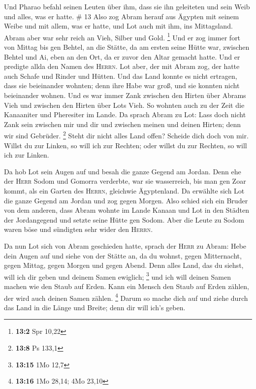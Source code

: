  Und Pharao befahl seinen Leuten über ihm, dass sie ihn
geleiteten und sein Weib und alles, was er hatte. \# 13 
Also zog Abram herauf aus Ägypten mit seinem Weibe und mit allem, was er
hatte, und Lot auch mit ihm, ins Mittagsland.  Abram aber
war sehr reich an Vieh, Silber und Gold. \footnote{\textbf{13:2} Spr
  10,22}  Und er zog immer fort von Mittag bis gen Behtel,
an die Stätte, da am ersten seine Hütte war, zwischen Behtel und Ai,
 eben an den Ort, da er zuvor den Altar gemacht hatte. Und
er predigte allda den Namen des \textsc{Herrn}.  Lot aber,
der mit Abram zog, der hatte auch Schafe und Rinder und Hütten.
 Und das Land konnte es nicht ertragen, dass sie
beieinander wohnten; denn ihre Habe war groß, und sie konnten nicht
beieinander wohnen.  Und es war immer Zank zwischen den
Hirten über Abrams Vieh und zwischen den Hirten über Lots Vieh. So
wohnten auch zu der Zeit die Kanaaniter und Pheresiter im Lande.
 Da sprach Abram zu Lot: Lass doch nicht Zank sein
zwischen mir und dir und zwischen meinen und deinen Hirten; denn wir
sind Gebrüder. \footnote{\textbf{13:8} Ps 133,1}  Steht
dir nicht alles Land offen? Scheide dich doch von mir. Willst du zur
Linken, so will ich zur Rechten; oder willst du zur Rechten, so will ich
zur Linken.

 Da hob Lot sein Augen auf und besah die ganze Gegend am
Jordan. Denn ehe der \textsc{Herr} Sodom und Gomorra verderbte, war sie
wasserreich, bis man gen Zoar kommt, als ein Garten des \textsc{Herrn},
gleichwie Ägyptenland.  Da erwählte sich Lot die ganze
Gegend am Jordan und zog gegen Morgen. Also schied sich ein Bruder von
dem anderen,  dass Abram wohnte im Lande Kanaan und Lot
in den Städten der Jordangegend und setzte seine Hütte gen Sodom.
 Aber die Leute zu Sodom waren böse und sündigten sehr
wider den \textsc{Herrn}.

 Da nun Lot sich von Abram geschieden hatte, sprach der
\textsc{Herr} zu Abram: Hebe dein Augen auf und siehe von der Stätte an,
da du wohnst, gegen Mitternacht, gegen Mittag, gegen Morgen und gegen
Abend.  Denn alles Land, das du siehst, will ich dir
geben und deinem Samen ewiglich; \footnote{\textbf{13:15} 1Mo 12,7}
 und ich will deinen Samen machen wie den Staub auf
Erden. Kann ein Mensch den Staub auf Erden zählen, der wird auch deinen
Samen zählen. \footnote{\textbf{13:16} 1Mo 28,14; 4Mo 23,10}
 Darum so mache dich auf und ziehe durch das Land in die
Länge und Breite; denn dir will ich's geben.

